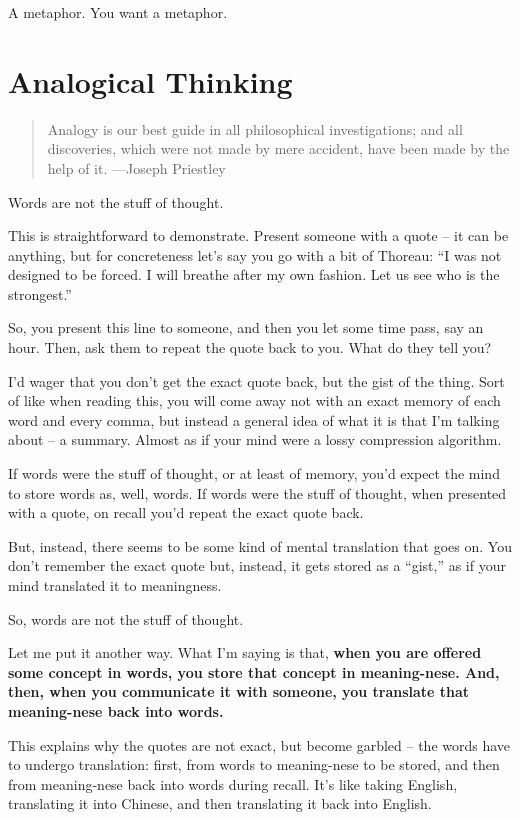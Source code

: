 A metaphor. You want a metaphor.

\section{Analogical Thinking}

\begin{quote}
Analogy is our best guide in all philosophical investigations; and all
discoveries, which were not made by mere accident, have been made by the
help of it. \label{quote-attribute}{---Joseph Priestley}
\end{quote}

Words are not the stuff of thought.

This is straightforward to demonstrate. Present someone with a quote --
it can be anything, but for concreteness let's say you go with a bit of
Thoreau: ``I was not designed to be forced. I will breathe after my own
fashion. Let us see who is the strongest.''

So, you present this line to someone, and then you let some time pass,
say an hour. Then, ask them to repeat the quote back to you. What do
they tell you?

I'd wager that you don't get the exact quote back, but the gist of the
thing. Sort of like when reading this, you will come away not with an
exact memory of each word and every comma, but instead a general idea of
what it is that I'm talking about -- a summary. Almost as if your mind
were a lossy compression algorithm.

If words were the stuff of thought, or at least of memory, you'd expect
the mind to store words as, well, words. If words were the stuff of
thought, when presented with a quote, on recall you'd repeat the exact
quote back.

But, instead, there seems to be some kind of mental translation that
goes on. You don't remember the exact quote but, instead, it gets stored
as a ``gist,'' as if your mind translated it to meaningness.

So, words are not the stuff of thought.

Let me put it another way. What I'm saying is that, \textbf{when you are
offered some concept in words, you store that concept in meaning-nese.
And, then, when you communicate it with someone, you translate that
meaning-nese back into words.}

This explains why the quotes are not exact, but become garbled -- the
words have to undergo translation: first, from words to meaning-nese to
be stored, and then from meaning-nese back into words during recall.
It's like taking English, translating it into Chinese, and then
translating it back into English.

